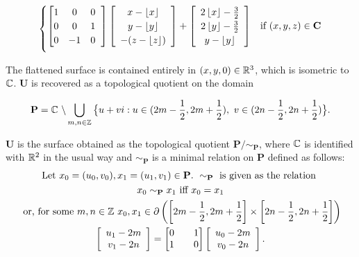 \documentclass[]{article}
\def\bU{\mathbf{U}} \def\btU{\tilde{\bU}} \def\bUs{\bU^\circ}
\begin{document}
\begin{equation}
\begin{cases}
		\left[ \begin{matrix}
		1 & 0 & 0 \\
		0 & 0 & 1 \\
		0 & -1 & 0
		\end{matrix}\hspace{2mm}\right]
		\left[\begin{array}{c}
			x - \left\lfloor x \right\rfloor
			\\ y- \left\lfloor y \right\rfloor
			\\ -(z - \left\lfloor z \right\rfloor)
			\end{array} \right]
		+
			\left[\begin{array}{c}
				2 \left\lfloor x \right\rfloor - \frac{3}{2}
				\\ 2\left\lfloor y \right\rfloor - \frac{3}{2}
				\\ y - \left\lfloor y \right\rfloor
			\end{array} \right]
				& \text{if } (x,y,z)\in \mathbf{C}	\vspace{2mm}
\end{cases}
\end{equation}

The flattened surface is contained entirely in $(x,y,0)\in\mathbb{R}^3$, which is isometric to $\mathbb{C}$. $\bU$ is recovered as a topological quotient on the domain

\begin{equation}
\label{eq:P}
\mathbf{P} = \mathbb{C}\text{ }\backslash\bigcup_{m,n \in {\mathbb Z}} \big{\{} u+vi:u\in(2m-\frac{1}{2},2m+\frac{1}{2}),\text{ } v\in(2n-\frac{1}{2},2n+\frac{1}{2})\big{\}}.
\end{equation}

\begin{Def} $\mathbf U$ is the surface obtained as the topological quotient $\mathbf{P}/\sim_{\mathbf{P}}$, where $\mathbb{C}$ is identified with $\mathbb{R}^2$ in the usual way and $\sim_{\mathbf{P}}$ is a minimal relation on $\mathbf{P}$ defined as follows:
\begin{gather*}
\text{Let } x_{0}=(u_{0},v_{0}),x_{1}=(u_{1},v_{1}) \in \mathbf{P}.  \text{ }\sim_{\mathbf{P}} \text { is given as the relation }\\ x_{0}\sim_{\mathbf{P}}x_{1}  \text{ iff } x_{0}=x_{1}
 \\\text{ or, for some }m,n\in\mathbb{Z}~x_{0},x_{1} \in {\partial} \left( \left[2m-\frac{1}{2},2m+\frac{1}{2}\right] \times \left[2n-\frac{1}{2},2n+\frac{1}{2}\right] \right)\\
  \left[\begin{array}{c}
u_{1} -2m
\\v_{1}-2n
\end{array}\right] = \left[\begin{matrix}
0 && 1\\
1 && 0
\end{matrix}\right]
\left[ \begin{array}{c}u_{0}-2m\\
v_{0}-2n
\end{array}\right]
. \end{gather*}
\end{Def}
\end{document}
